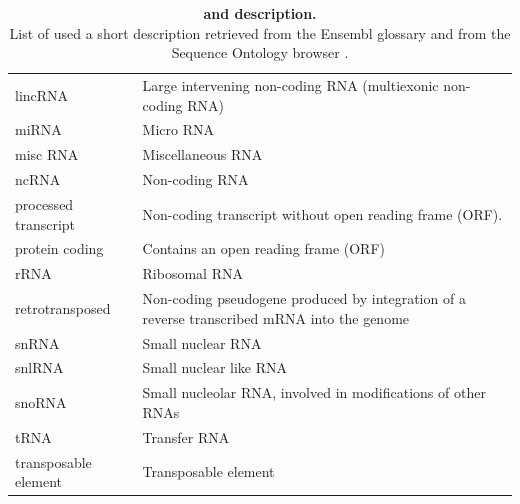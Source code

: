 \begin{table}[ht]
\begin{center}
\begin{tabular*}{\textwidth}{p{0.2004\hsize} p{0.738\hsize} }
      lincRNA              & Large intervening non-coding RNA (multiexonic non-coding RNA)                               \\
      miRNA                & Micro RNA                                                                                   \\
      misc RNA             & Miscellaneous RNA                                                                           \\
      ncRNA                & Non-coding RNA                                                                              \\
      processed transcript & Non-coding transcript without open reading frame (ORF).                                     \\
      protein coding       & Contains an open reading frame (ORF)                                                        \\
      rRNA                 & Ribosomal RNA                                                                               \\
      retrotransposed      & Non-coding pseudogene produced by integration of a reverse transcribed mRNA into the genome \\
      snRNA                & Small nuclear RNA                                                                           \\
      snlRNA               & Small nuclear like RNA                                                                      \\
      snoRNA               & Small nucleolar RNA, involved in modifications of other RNAs                                \\
      tRNA                 & Transfer RNA                                                                                \\
      transposable element & Transposable element                                                                        \\ \hline
    \end{tabular*}
    \caption [Biotypes and description]{%
      \textbf{ and description.} \\
      List of  used a short description retrieved from the Ensembl glossary \cite{Flicek2011} and from the Sequence Ontology browser \cite{Eilbeck2005}.}
    \label{tab:biotypes}
  \end{center}
\end{table}

